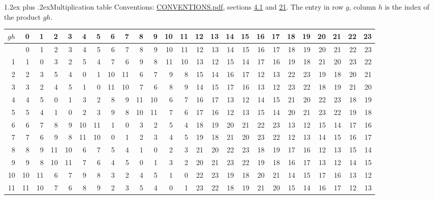 \documentclass[10pt,a4paper]{article}
\makeatletter
\renewcommand\section{\@startsection{section}{1}{\z@}{-3ex plus -1ex minus -.2ex}%
  {1.2ex plus .2ex}{\normalfont\large\sffamily\bfseries\color{parttitle}}}
\numberwithin{equation}{section}
\makeatother
\begin{document}
\section{Multiplication table}\label{s:multiplication}
Conventions: \href{../../CONVENTIONS.pdf}{CONVENTIONS.pdf}, sections \href{../../../rotation/CONVENTIONS.pdf\#conv.4.1}{4.1} and \href{../../CONVENTIONS.pdf\#conv.21}{21}.
The entry in row $g$, column $h$ is the index of the product $gh$.
{\normalsize\setlength{\tabcolsep}{0.1em}\setlength{\LTleft}{-8pt plus 1fill}\setlength{\LTright}{-8pt plus 1fill}\begin{longtable}{@{}r|rrrrrrrrrrrrrrrrrrrrrrrr@{}}\toprule
$gh$ & 0 & 1 & 2 & 3 & 4 & 5 & 6 & 7 & 8 & 9 & 10 & 11 & 12 & 13 & 14 & 15 & 16 & 17 & 18 & 19 & 20 & 21 & 22 & 23\\\midrule\endhead
\bottomrule\endfoot\endlastfoot
0 & 0 & 1 & 2 & 3 & 4 & 5 & 6 & 7 & 8 & 9 & 10 & 11 & 12 & 13 & 14 & 15 & 16 & 17 & 18 & 19 & 20 & 21 & 22 & 23\\*
1 & 1 & 0 & 3 & 2 & 5 & 4 & 7 & 6 & 9 & 8 & 11 & 10 & 13 & 12 & 15 & 14 & 17 & 16 & 19 & 18 & 21 & 20 & 23 & 22\\
2 & 2 & 3 & 5 & 4 & 0 & 1 & 10 & 11 & 6 & 7 & 9 & 8 & 15 & 14 & 16 & 17 & 12 & 13 & 22 & 23 & 19 & 18 & 20 & 21\\
3 & 3 & 2 & 4 & 5 & 1 & 0 & 11 & 10 & 7 & 6 & 8 & 9 & 14 & 15 & 17 & 16 & 13 & 12 & 23 & 22 & 18 & 19 & 21 & 20\\
4 & 4 & 5 & 0 & 1 & 3 & 2 & 8 & 9 & 11 & 10 & 6 & 7 & 16 & 17 & 13 & 12 & 14 & 15 & 21 & 20 & 22 & 23 & 18 & 19\\
5 & 5 & 4 & 1 & 0 & 2 & 3 & 9 & 8 & 10 & 11 & 7 & 6 & 17 & 16 & 12 & 13 & 15 & 14 & 20 & 21 & 23 & 22 & 19 & 18\\
6 & 6 & 7 & 8 & 9 & 10 & 11 & 1 & 0 & 3 & 2 & 5 & 4 & 18 & 19 & 20 & 21 & 22 & 23 & 13 & 12 & 15 & 14 & 17 & 16\\
7 & 7 & 6 & 9 & 8 & 11 & 10 & 0 & 1 & 2 & 3 & 4 & 5 & 19 & 18 & 21 & 20 & 23 & 22 & 12 & 13 & 14 & 15 & 16 & 17\\
8 & 8 & 9 & 11 & 10 & 6 & 7 & 5 & 4 & 1 & 0 & 2 & 3 & 21 & 20 & 22 & 23 & 18 & 19 & 17 & 16 & 12 & 13 & 15 & 14\\
9 & 9 & 8 & 10 & 11 & 7 & 6 & 4 & 5 & 0 & 1 & 3 & 2 & 20 & 21 & 23 & 22 & 19 & 18 & 16 & 17 & 13 & 12 & 14 & 15\\
10 & 10 & 11 & 6 & 7 & 9 & 8 & 3 & 2 & 4 & 5 & 1 & 0 & 22 & 23 & 19 & 18 & 20 & 21 & 14 & 15 & 17 & 16 & 13 & 12\\
11 & 11 & 10 & 7 & 6 & 8 & 9 & 2 & 3 & 5 & 4 & 0 & 1 & 23 & 22 & 18 & 19 & 21 & 20 & 15 & 14 & 16 & 17 & 12 & 13\\

\end{longtable}}
\end{document}
